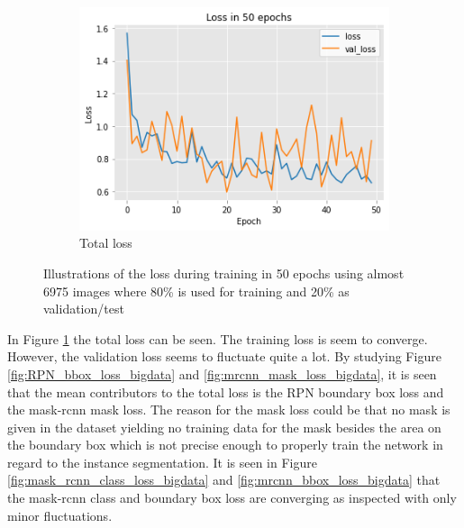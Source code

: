 \documentclass[../Head/Main.tex]{subfiles}
\begin{document}
\begin{figure}[H]
\begin{subfigure}[t]{.32\textwidth}
        \centering
        \includegraphics[width=\textwidth]{../Figures/rcnn_results/loss/plot_bigdata1.png}
        \caption{Total loss}
        \label{fig:total_loss_bigdata}
    \end{subfigure}
    \caption{Illustrations of the loss during training in 50 epochs using almost 6975 images where 80\% is used for training and 20\% as validation/test}
     \label{fig:bigdata_analysis2}
\end{figure}

In Figure \ref{fig:total_loss_bigdata} the total loss can be seen. The training loss is seem to converge. However, the validation loss seems to fluctuate quite a lot. By studying Figure \ref{fig:RPN_bbox_loss_bigdata} and \ref{fig:mrcnn_mask_loss_bigdata}, it is seen that the mean contributors to the total loss is the RPN boundary box loss and the mask-rcnn mask loss. The reason for the mask loss could be that no mask is given in the dataset yielding no training data for the mask besides the area on the boundary box which is not precise enough to properly train the network in regard to the instance segmentation. It is seen in Figure \ref{fig:mask_rcnn_class_loss_bigdata} and \ref{fig:mrcnn_bbox_loss_bigdata} that the mask-rcnn class and boundary box loss are converging as inspected with only minor fluctuations.
\end{document}
